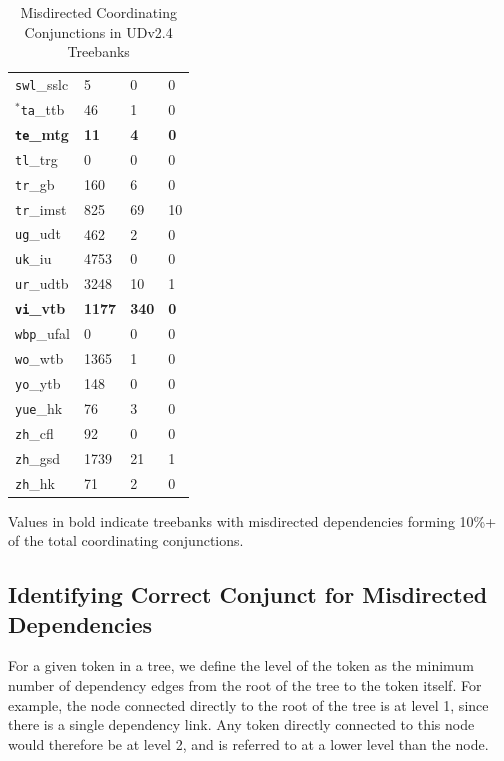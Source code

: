 \begin{table}[H]
{\begin{tabular}{|l|l|l|l|}
\texttt{swl}\_sslc & 5 & 0 & 0\\
\(^{*}\)\texttt{ta}\_ttb & 46 & 1 & 0\\
\textbf{\texttt{te}\_mtg} & \textbf{11} & \textbf{4} & \textbf{0}\\
\texttt{tl}\_trg & 0 & 0 & 0\\
\texttt{tr}\_gb & 160 & 6 & 0\\
\texttt{tr}\_imst & 825 & 69 & 10\\
\texttt{ug}\_udt & 462 & 2 & 0\\
\texttt{uk}\_iu & 4753 & 0 & 0\\
\texttt{ur}\_udtb & 3248 & 10 & 1\\
\textbf{\texttt{vi}\_vtb} & \textbf{1177} & \textbf{340} & \textbf{0}\\
\texttt{wbp}\_ufal & 0 & 0 & 0\\
\texttt{wo}\_wtb & 1365 & 1 & 0\\
\texttt{yo}\_ytb & 148 & 0 & 0\\
\texttt{yue}\_hk & 76 & 3 & 0\\
\texttt{zh}\_cfl & 92 & 0 & 0\\
\texttt{zh}\_gsd & 1739 & 21 & 1\\
\texttt{zh}\_hk & 71 & 2 & 0\\
\hline
\end{tabular}
}
\caption{Misdirected Coordinating Conjunctions in UDv2.4 Treebanks}
Values in bold indicate treebanks with misdirected dependencies forming 10\%+ of the total coordinating conjunctions.
\label{tab:conjunctions_all}
\end{table}


\subsection{Identifying Correct Conjunct for Misdirected Dependencies}
\label{ssec:conjunct-search}

For a given token in a tree, we define the level of the token as the minimum number of dependency edges from the root of the tree to the token itself. For example, the node connected directly to the root of the tree is at level 1, since there is a single dependency link. Any token directly connected to this node would therefore be at level 2, and is referred to at a lower level than the node.

